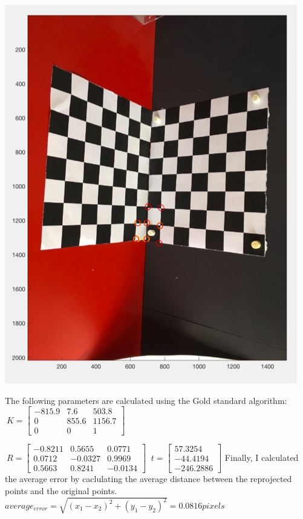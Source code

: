 \documentclass[]{article}
\begin{document}
\includegraphics{golden_standard.png}
\medskip

The following parameters are calculated using the Gold standard algorithm:
$\
K =
\begin{bmatrix}
-815.9       & 7.6  & 503.8 \\
0     & 855.6 & 1156.7 \\
0     & 0 &  1
\end{bmatrix}$

$\
R =
\begin{bmatrix}
-0.8211        &  0.5655  &   0.0771\\
0.0712     & -0.0327 & 0.9969 \\
0.5663     & 0.8241 &  -0.0134
\end{bmatrix}$\newline
\newline
$\
t =
\begin{bmatrix}
 57.3254   \\
-44.4194  \\
-246.2886
\end{bmatrix}$\newline
Finally, I calculated the average error by caclulating the average distance between the reprojected points and the original points. 
$average_{error} = \sqrt{(x_1 - x_2)^2 + (y_1 - y_2)^2} = 0.0816 pixels$\newline
\end{document}
